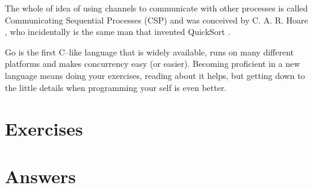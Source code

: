 The whole of idea of using channels to communicate with other processes
is called Communicating Sequential Processes (CSP) and was conceived
by C. A. R. Hoare \cite{hoare}, who incidentally is the same man that
invented QuickSort \cite{Quicksort}.

\begin{lbar}
Go is the first C--like language that is widely available,
runs on many
different platforms and makes concurrency easy (or easier).
Becoming proficient in a new language means doing your exercises,
reading about it helps, but getting down to the little details when 
programming your self is even better.
\end{lbar}

\section{Exercises}


\cleardoublepage
\section{Answers}
\shipoutAnswer
